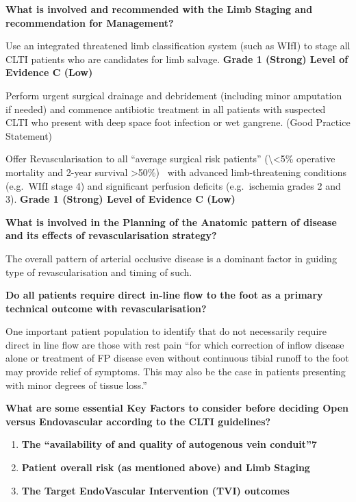 \documentclass[
]{book}
\begin{document}
\textbf{What is involved and recommended with the Limb Staging and
recommendation for Management?}

Use an integrated threatened limb classification system (such as WIfI)
to stage all CLTI patients who are candidates for limb salvage. \textbf{Grade
1 (Strong) Level of Evidence C (Low)}

Perform urgent surgical drainage and debridement (including minor
amputation if needed) and commence antibiotic treatment in all patients
with suspected CLTI who present with deep space foot infection or wet
gangrene. (Good Practice Statement)

Offer Revascularisation to all ``average surgical risk patients'' (\textbackslash\textless5\%
operative mortality and 2-year survival \textgreater50\%)~ with advanced
limb-threatening conditions (e.g.~WIfI stage 4) and significant
perfusion deficits (e.g.~ischemia grades 2 and 3). \textbf{Grade 1 (Strong)
Level of Evidence C (Low)}

\textbf{What is involved in the Planning of the Anatomic pattern of disease
and its effects of revascularisation strategy?}

The overall pattern of arterial occlusive disease is a dominant factor
in guiding type of revascularisation and timing of such.

\textbf{Do all patients require direct in-line flow to the foot as a primary
technical outcome with revascularisation?}

One important patient population to identify that do not necessarily
require direct in line flow are those with rest pain ``for which
correction of inflow disease alone or treatment of FP disease even
without continuous tibial runoff to the foot may provide relief of
symptoms. This may also be the case in patients presenting with minor
degrees of tissue loss.''

\textbf{What are some essential Key Factors to consider before deciding Open
versus Endovascular according to the CLTI guidelines?}

\begin{enumerate}
\def\labelenumi{\arabic{enumi}.}
\item
  \textbf{The ``availability of and quality of autogenous vein conduit''7}
\item
  \textbf{Patient overall risk (as mentioned above) and Limb Staging}
\item
  \textbf{The Target EndoVascular Intervention (TVI) outcomes}
\end{enumerate}
\end{document}
